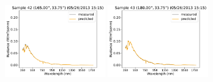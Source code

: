\begin{center}
\includegraphics[width=0.325\textwidth]{img/05261515_s42.pdf}
\includegraphics[width=0.325\textwidth]{img/05261515_s43.pdf}
\end{center}

\mbox{}
\clearpage
